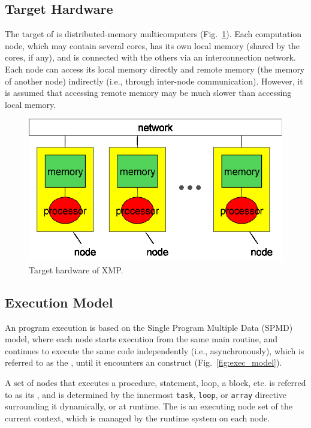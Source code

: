 \subsection{Target Hardware}

The target of {\XMP} is distributed-memory multicomputers
(Fig.~\ref{fig1}). Each computation node, which may contain several
cores, has
its own local memory (shared by the cores, if any), and is connected
with the others via an interconnection network.
%
Each node can access its local memory directly and remote memory (the
memory of another node) indirectly (i.e., through inter-node 
communication). However, it is assumed that accessing remote memory may
be much slower than accessing local memory.

\begin{figure}
  \centering
  \includegraphics[width=12cm]{figs/Fig1.eps}
  \caption{Target hardware of XMP.}\label{fig1}
\end{figure}


\subsection{Execution Model}

An {\XMP} program execution is based on the Single Program Multiple Data
(SPMD) model, where each node starts execution from the same main
routine, and continues to execute the same code independently
(i.e., asynchronously), which is referred to as the {\it {}}, until it encounters an {\XMP} construct
(Fig.~\ref{fig:exec_model}).

A set of nodes that executes a procedure, statement, loop,
a block, etc. is referred to as its {\it {}}, and is
determined by the innermost {\tt task}, {\tt loop}, or {\tt array}
directive surrounding it dynamically, or at runtime.
%
The {\it {}} is an executing node set of
the current context, which is managed by the {\XMP} runtime system on
each node.

